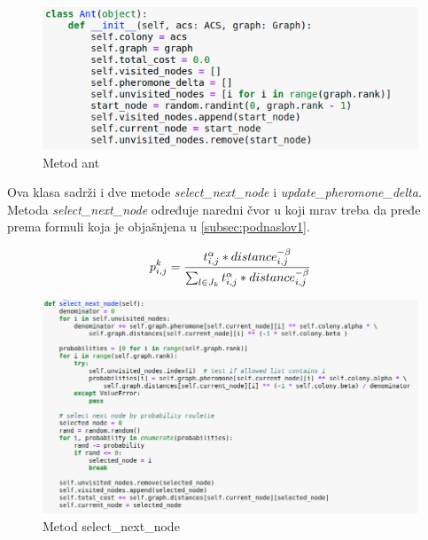 \documentclass[a4paper]{article}
\begin{document}
{\begin{itemize}
\end{itemize}



\begin{figure}[h!]
\begin{center}
\includegraphics[width=1\columnwidth]{slika5.png}
\end{center}
\caption{Metod ant}
\label{fig:slika5}
\end{figure}

Ova klasa sadrži i dve metode \textit{select\_next\_node} i \textit{update\_pheromone\_delta}.
Metoda \textit{select\_next\_node} određuje naredni čvor u koji mrav treba da pređe prema formuli koja je objašnjena u \ref{subsec:podnaslov1}. 

\begin{equation}\label{1}
p_{i,j}^k = {t_{i,j}^\alpha * distance_{i,j}^{-\beta} \over \sum_{l \in J_k}^{} t_{i,j}^\alpha * distance_{i,j}^{-\beta}}
\end{equation}

\begin{figure}[h!]
\begin{center}
\includegraphics[width=1\columnwidth]{slika6.png}
\end{center}
\caption{Metod select\_next\_node}
\label{fig:slika5}
\end{figure}

}
\end{document}
